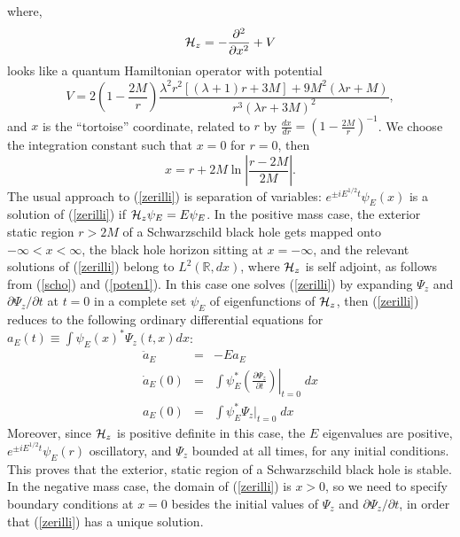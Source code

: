 \documentclass[aps,floats,showpacs,amssymb,tightenlines]{revtex4}
\def\p{\partial}
\begin{document}
where,
\begin{equation} \label{scho}
{\cal H}_z = -\frac{\partial^2 }{\partial x^2} +V
\end{equation}
looks like a  quantum Hamiltonian operator  with potential
\begin{equation}
\label{poten1}
V = 2 \left(1 -\frac{2 M}{ r}\right) {\frac{ \lambda^2 r^2
\left[(\lambda+1) r + 3 M \right] + 9 M^2 (\lambda r +M)}{ r^3
(\lambda r + 3 M)^2} } ,
\end{equation}
and $x$ is the ``tortoise'' coordinate, related to $r$ by $\frac{dx}{dr}=\left(1-\frac{2M}{r}\right)^{-1}$.
We choose the integration constant such that $x=0$ for $r=0$, then
\begin{equation}\label{tortu}
x = r +2 M \ln \left| \frac{r-2M}{2M}\right|.
\end{equation}
The usual approach to (\ref{zerilli}) is separation of variables:  $e^{\pm i E^{1/2} t} \psi_E(x)$
is a solution of (\ref{zerilli}) if ${\cal H}_z \psi_E = E \psi_E$.
In the positive mass case,   the exterior static region
$r>2M$ of a Schwarzschild black hole gets mapped onto $-\infty < x< \infty$,
the black hole horizon sitting at $x=-\infty$,
and  the relevant solutions
of (\ref{zerilli})
belong to $L^2({\mathbb R},dx)$, where ${\cal H}_z$ is self adjoint, as follows
from (\ref{scho}) and (\ref{poten1}).
In this case one solves (\ref{zerilli}) by expanding $\Psi_z$ and $\p \Psi_z / \p t$ at $t=0$
 in a complete set $\psi_E$ of eigenfunctions of ${\cal H}_z$,   then (\ref{zerilli}) reduces
 to  the following ordinary differential equations for $a_E(t) \equiv \int \psi_E(x) ^* \Psi_z(t,x) dx$:
\begin{eqnarray}
 \ddot a_E &=& -E a_E \\
 \dot a_E(0) &=& \int \psi_E ^* \left.  \left(\frac{\p \Psi_z}{ \p t}\right)
 \right \vert _{t=0}  \; dx  \\
 a_E(0) &=& \int \psi_E ^* \Psi_z |_{t=0} \; dx
\end{eqnarray}
  Moreover, since ${\cal H}_z$ is positive definite in this case, the  $E$ eigenvalues  are positive, $e^{\pm i E^{1/2} t} \psi_E(r)$
  oscillatory, and $\Psi_z$
   bounded at all times,
    for any initial conditions. This proves that the exterior, static region of a Schwarzschild black hole is stable.\\
In the negative mass case, the domain of (\ref{zerilli}) is $x>0$, so we need to specify boundary conditions at
 $x=0$ besides the initial values of $\Psi_z$ and $\p\Psi_z / \p t$, in order that (\ref{zerilli}) has  a unique solution.
\end{document}
